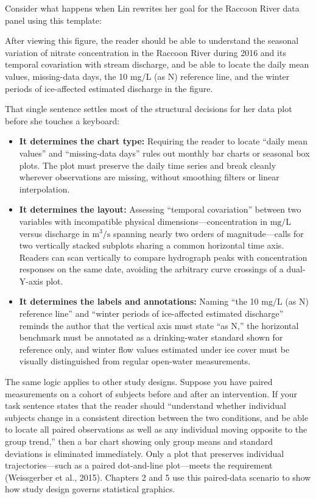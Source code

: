 Consider what happens when Lin rewrites her goal for the Raccoon River data panel using this template:

\begin{BookNote}
After viewing this figure, the reader should be able to understand the seasonal variation of nitrate concentration in the Raccoon River during 2016 and its temporal covariation with stream discharge, and be able to locate the daily mean values, missing-data days, the 10 mg/L (as N) reference line, and the winter periods of ice-affected estimated discharge in the figure.
\end{BookNote}

That single sentence settles most of the structural decisions for her data plot before she touches a keyboard:
\begin{itemize}
\item \textbf{It determines the chart type:} Requiring the reader to locate ``daily mean values'' and ``missing-data days'' rules out monthly bar charts or seasonal box plots. The plot must preserve the daily time series and break cleanly wherever observations are missing, without smoothing filters or linear interpolation.
\item \textbf{It determines the layout:} Assessing ``temporal covariation'' between two variables with incompatible physical dimensions---concentration in $\text{mg/L}$ versus discharge in $\text{m}^3/\text{s}$ spanning nearly two orders of magnitude---calls for two vertically stacked subplots sharing a common horizontal time axis. Readers can scan vertically to compare hydrograph peaks with concentration responses on the same date, avoiding the arbitrary curve crossings of a dual-Y-axis plot.
\item \textbf{It determines the labels and annotations:} Naming ``the 10 mg/L (as N) reference line'' and ``winter periods of ice-affected estimated discharge'' reminds the author that the vertical axis must state ``as N,'' the horizontal benchmark must be annotated as a drinking-water standard shown for reference only, and winter flow values estimated under ice cover must be visually distinguished from regular open-water measurements.
\end{itemize}

The same logic applies to other study designs. Suppose you have paired measurements on a cohort of subjects before and after an intervention. If your task sentence states that the reader should ``understand whether individual subjects change in a consistent direction between the two conditions, and be able to locate all paired observations as well as any individual moving opposite to the group trend,'' then a bar chart showing only group means and standard deviations is eliminated immediately. Only a plot that preserves individual trajectories---such as a paired dot-and-line plot---meets the requirement (Weissgerber et al., 2015). Chapters 2 and 5 use this paired-data scenario to show how study design governs statistical graphics.

